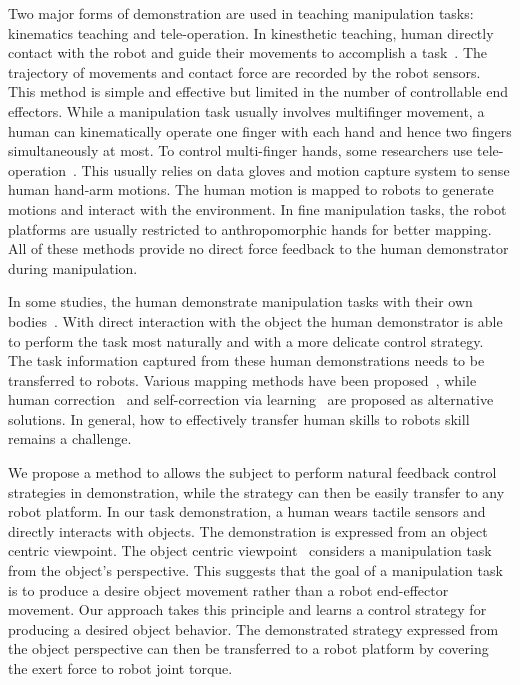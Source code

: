 Two major forms of demonstration are used in teaching manipulation tasks: kinematics teaching and tele-operation. In kinesthetic teaching, human directly contact with the robot and guide their movements to accomplish a task~\citep{korkinof2013online,pais2014encoding,pastor2011skill,Miao2014}. The trajectory of movements and contact force are recorded by the robot sensors.
This method is simple and effective but limited in the number of controllable end effectors. While a manipulation task usually involves multifinger movement, a human can kinematically operate one finger with each hand and hence two fingers simultaneously at most. To control multi-finger hands, some researchers use tele-operation~\citep{bernardino2013precision,kondo2008recognition,Fischer98}. This usually relies on data gloves and motion capture system to sense human hand-arm motions. The human motion is mapped to robots to generate motions and interact with the environment. In fine manipulation tasks, the robot platforms are usually restricted to anthropomorphic hands for better mapping. All of these methods provide no direct force feedback to the human demonstrator during manipulation.

In some studies, the human demonstrate manipulation tasks with their own bodies~\citep{asfour2008imitation}. With direct interaction with the object the human demonstrator is able to perform the task most naturally and with a more delicate control strategy. The task information captured from these human demonstrations needs to be transferred to robots. Various mapping methods have been proposed~\citep{hueser2006learning,asfour2008imitation,do2011towards,}, while human correction~\citep{calinon2007incremental,sauser2011iterative,romano2011human} and self-correction via learning~\citep{bidan2013robio} are proposed as alternative solutions. In general, how to effectively transfer human skills to robots skill remains a challenge.

We propose a method to allows the subject to perform natural feedback control strategies in demonstration, while the strategy can then be easily transfer to any robot platform. In our task demonstration, a human wears tactile sensors and directly interacts with objects. The demonstration is expressed from an object centric viewpoint. The object centric viewpoint~\citep{okamura2000overview,jain2013improving,Miao2014} considers a manipulation task from the object's perspective. This suggests that the goal of a manipulation task is to produce a desire object movement rather than a robot end-effector movement. Our approach takes this principle and learns a control strategy for producing a desired object behavior.
The demonstrated strategy expressed from the object perspective can then be transferred to a robot platform by covering the exert force to robot joint torque.

